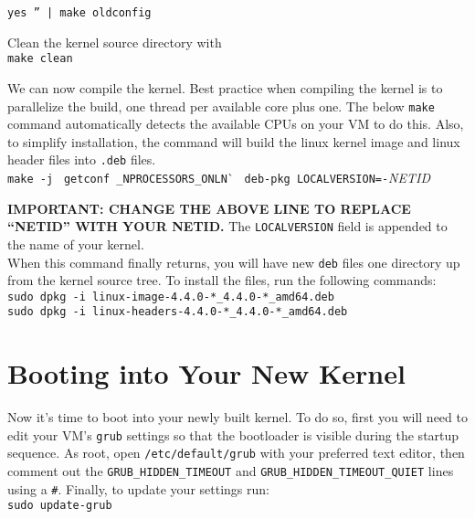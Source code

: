 \documentclass[10pt]{article}
\begin{document}
\noindent
{\footnotesize
{\tt yes '' | make oldconfig}\\
}

Clean the kernel source directory with\\

\noindent
{\footnotesize
{\tt make clean}\\
}

We can now compile the kernel. Best practice when compiling the kernel is to parallelize the build, one thread per available core plus one. The below {\tt make} command automatically detects the available CPUs on your VM to do this. Also, to simplify installation, the command will build the linux kernel image and linux header files into {\tt .deb} files.\\

\noindent
{\footnotesize
{\tt make -j~} \`{\tt getconf \_NPROCESSORS\_ONLN}\`~ {\tt deb-pkg LOCALVERSION=-}{\it NETID}\\
}

\noindent
{\bf IMPORTANT: CHANGE THE ABOVE LINE TO REPLACE ``NETID'' WITH YOUR NETID.} The {\tt LOCALVERSION} field is appended to the name of your kernel. \\

When this command finally returns, you will have  new {\tt deb} files one directory up from the kernel source tree. To install the files, run the following commands:\\

\noindent
{\footnotesize
{\tt sudo dpkg -i linux-image-4.4.0-*\_4.4.0-*\_amd64.deb} \\
{\tt sudo dpkg -i linux-headers-4.4.0-*\_4.4.0-*\_amd64.deb}\\
}

\section{Booting into Your New Kernel}

Now it's time to boot into your newly built kernel. To do so, first you will need to edit your VM's {\tt grub} settings so that the bootloader is visible during the startup sequence. As root, open {\tt /etc/default/grub} with your preferred text editor, then comment out the {\tt GRUB\_HIDDEN\_TIMEOUT} and {\tt GRUB\_HIDDEN\_TIMEOUT\_QUIET} lines using a {\tt \#}. Finally, to update your settings run:\\

\noindent
{\footnotesize
{\tt sudo update-grub} \\
}
\end{document}
